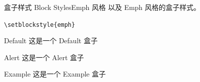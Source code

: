\documentclass[10pt,aspectratio=169,fontset=none]{ctexbeamer}
\begin{document}
    \begin{frame}{盒子样式 Block Styles}{Emph 风格}
    以及 Emph 风格的盒子样式。   

        \begin{center}
            \texttt{\textcolor{primary}{\textbackslash setblockstyle}\{emph\}}
        \end{center}

        \centering
        \begin{minipage}[b]{0.28\textwidth}
            \begin{block}{Default}
                这是一个 Default 盒子
            \end{block}    
        \end{minipage}
        \hspace*{1em}
        \begin{minipage}[b]{0.28\textwidth}
            \begin{alertblock}{Alert}
                这是一个 Alert 盒子
            \end{alertblock}      
        \end{minipage}
        \hspace*{1em}
        \begin{minipage}[b]{0.28\textwidth}
            \begin{exampleblock}{Example}
                这是一个 Example 盒子
            \end{exampleblock}       
        \end{minipage}
    \end{frame}
\end{document}
